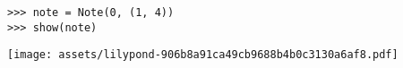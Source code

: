 \begin{comment}
<abjad>
note = Note(0, (1, 4))
show(note)
</abjad>
\end{comment}

\begin{lstlisting}
>>> note = Note(0, (1, 4))
>>> show(note)
\end{lstlisting}
\noindent\texttt{[image: assets/lilypond-906b8a91ca49cb9688b4b0c3130a6af8.pdf]}
